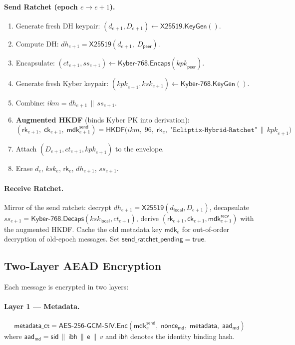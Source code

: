 \documentclass[11pt,a4paper]{article}
\theoremstyle{definition}
\theoremstyle{remark}
\newcommand{\HKDF}{\mathsf{HKDF}}
\newcommand{\AEAD}{\mathsf{AES\text{-}256\text{-}GCM\text{-}SIV}}
\renewcommand{\DH}{\mathsf{X25519}}
\newcommand{\KEM}{\mathsf{Kyber\text{-}768}}
\newcommand{\KeyGen}{\mathsf{KeyGen}}
\newcommand{\Encaps}{\mathsf{Encaps}}
\newcommand{\Decaps}{\mathsf{Decaps}}
\newcommand{\Enc}{\mathsf{Enc}}
\newcommand{\rk}{\mathsf{rk}}
\newcommand{\ck}{\mathsf{ck}}
\newcommand{\mdk}{\mathsf{mdk}}
\newcommand{\sid}{\mathsf{sid}}
\newcommand{\epoch}{\mathsf{e}}
\newcommand{\concat}{\,\|\,}
\begin{document}
\paragraph{Send Ratchet (epoch $e \to e{+}1$).}
\begin{enumerate}[nosep]
  \item Generate fresh DH keypair: $(d_{e+1}, D_{e+1}) \gets \DH.\KeyGen()$.
  \item Compute DH: $\mathit{dh}_{e+1} = \DH(d_{e+1},\; D_{\mathsf{peer}})$.
  \item Encapsulate: $(\mathit{ct}_{e+1}, \mathit{ss}_{e+1}) \gets \KEM.\Encaps(\mathit{kpk}_{\mathsf{peer}})$.
  \item Generate fresh Kyber keypair: $(\mathit{kpk}_{e+1}, \mathit{ksk}_{e+1}) \gets \KEM.\KeyGen()$.
  \item Combine: $\mathit{ikm} = \mathit{dh}_{e+1} \concat \mathit{ss}_{e+1}$.
  \item \textbf{Augmented HKDF} (binds Kyber PK into derivation):
  \[
    (\rk_{e+1},\; \ck_{e+1},\; \mdk_{e+1}^{\mathsf{send}}) =
    \HKDF\bigl(\mathit{ikm},\; 96,\;
      \rk_e,\;
      \texttt{"Ecliptix-Hybrid-Ratchet"} \concat \mathit{kpk}_{e+1}\bigr)
  \]
  \item Attach $(D_{e+1}, \mathit{ct}_{e+1}, \mathit{kpk}_{e+1})$ to the envelope.
  \item Erase $d_e$, $\mathit{ksk}_e$, $\rk_e$, $\mathit{dh}_{e+1}$, $\mathit{ss}_{e+1}$.
\end{enumerate}

\paragraph{Receive Ratchet.}
Mirror of the send ratchet: decrypt $\mathit{dh}_{e+1} = \DH(d_{\mathsf{local}}, D_{e+1})$,
decapsulate $\mathit{ss}_{e+1} = \KEM.\Decaps(\mathit{ksk}_{\mathsf{local}}, \mathit{ct}_{e+1})$,
derive $(\rk_{e+1}, \ck_{e+1}, \mdk_{e+1}^{\mathsf{recv}})$ with the
augmented HKDF.  Cache the old metadata key $\mdk_e$ for out-of-order
decryption of old-epoch messages.  Set $\mathsf{send\_ratchet\_pending} = \mathsf{true}$.

\subsection{Two-Layer AEAD Encryption}
\label{subsec:aead}

Each message is encrypted in two layers:

\paragraph{Layer 1 --- Metadata.}
\[
  \mathsf{metadata\_ct} = \AEAD.\Enc(\mdk_e^{\mathsf{send}},\;
  \mathsf{nonce}_{\mathsf{md}},\;
  \mathsf{metadata},\; \mathsf{aad}_{\mathsf{md}})
\]
where $\mathsf{aad}_{\mathsf{md}} = \sid \concat
\mathsf{ibh} \concat \epoch \concat v$
and $\mathsf{ibh}$ denotes the identity binding hash.
\end{document}
